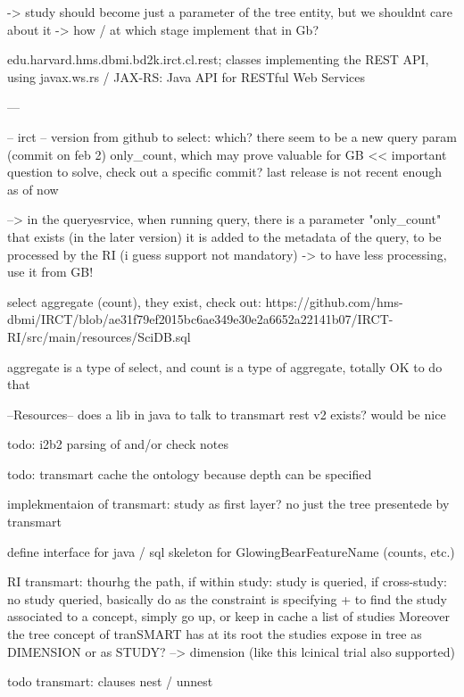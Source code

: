 -> study should become just a parameter of the tree entity, but we shouldnt care about it
-> how / at which stage implement that in Gb?

edu.harvard.hms.dbmi.bd2k.irct.cl.rest;
classes implementing the REST API, using javax.ws.rs / JAX-RS: Java API for RESTful Web Services

---

-- irct --
version from github to select: which? there seem to be a new query param (commit on feb 2) only\_count, which may prove valuable for GB << important question to solve, check out a specific commit? last release is not recent enough as of now 

--> in the queryesrvice, when running query, there is a parameter "only\_count" that exists (in the later version)
it is added to the metadata of the query, to be processed by the RI (i guess support not mandatory) 
-> to have less processing, use it from GB!

select aggregate (count), they exist, check out: https://github.com/hms-dbmi/IRCT/blob/ae31f79ef2015bc6ae349e30e2a6652a22141b07/IRCT-RI/src/main/resources/SciDB.sql

aggregate is a type of select, and count is a type of aggregate, totally OK to do that 



--Resources--
does a lib in java to talk to transmart rest v2 exists? would be nice

todo: i2b2 parsing of and/or check notes

todo: transmart cache the ontology because depth can be specified

implekmentaion of transmart: study as first layer? no just the tree presentede by transmart

define interface for java / sql skeleton for GlowingBearFeatureName (counts, etc.)


RI transmart: thourhg the path, if within study: study is queried, if cross-study: no study queried, basically do as the constraint is specifying
+ to find the study associated to a concept, simply go up, or keep in cache a list of studies
Moreover the tree concept of tranSMART has at its root the studies
expose in tree as DIMENSION or as STUDY? --> dimension (like this lcinical trial also supported)

todo transmart: clauses nest / unnest




